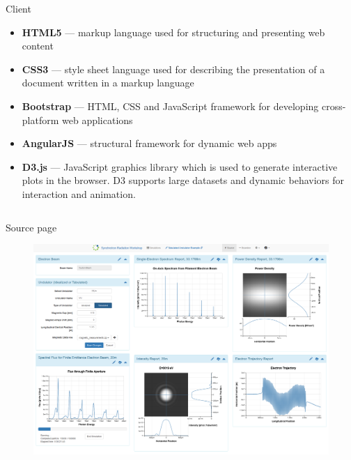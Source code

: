 \documentclass[final]{beamer}
\newlength{\onecolwid}
\newlength{\twocolwid}
\begin{document}
\begin{frame}[t]
\begin{columns}[t]
\begin{column}{\twocolwid}
\begin{columns}[t,totalwidth=\twocolwid]
\begin{column}{\onecolwid}
\begin{block}{\faFirefox{} \faChrome{} \faInternetExplorer{} Client}

\begin{itemize}
  \item {} \textbf{HTML5} --- markup language used for structuring and presenting web content
  \item {} \textbf{CSS3} --- style sheet language used for describing the presentation of a document written in a markup language
  \item \textbf{Bootstrap} --- HTML, CSS and JavaScript framework for developing cross-platform web
applications
  \item \textbf{AngularJS} --- structural framework for dynamic web apps
  \item \textbf{D3.js} --- JavaScript graphics library which is used to generate interactive plots in the browser. D3 supports large datasets and dynamic behaviors for interaction and animation.
\end{itemize}

\end{block}


\end{column} %
%
\end{columns} %

\vspace{-1.0cm}

\begin{block}{\faLightbulbO{} Source page}

\begin{figure}
\includegraphics[width=1.0\linewidth]{images/source_page.png}
\end{figure}


\end{block}
\end{column}
\end{columns}
\end{frame}
\end{document}
